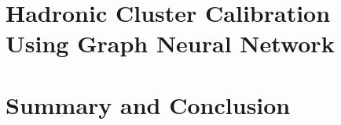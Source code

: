 \documentclass
[
]
{thesis}
\begin{document}
\chapter{Hadronic Cluster Calibration Using Graph Neural Network}
\label{chapter:ch5}

\chapter{Summary and Conclusion}
\label{chapter:ch7}




%

%

%




\end{document}
